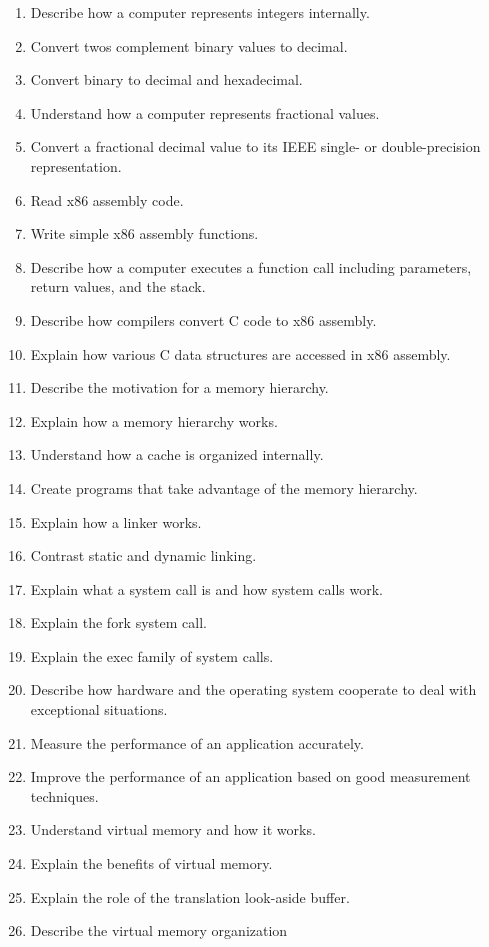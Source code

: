 \documentclass{article}
\begin{document}
\begin{enumerate}
\item Describe how a computer represents integers internally.
\item Convert twos complement binary values to decimal.
\item Convert binary to decimal and hexadecimal.
\item Understand how a computer represents fractional values.
\item Convert a fractional decimal value to its IEEE single- or double-precision representation.
\item Read x86 assembly code.
\item Write simple x86 assembly functions.
\item Describe how a computer executes a function call
including parameters, return values, and the stack.
\item Describe how compilers convert C code to x86 assembly.
\item Explain how various C data structures are accessed in x86 assembly.
\item Describe the motivation for a memory hierarchy.
\item Explain how a memory hierarchy works.
\item Understand how a cache is organized internally.
\item Create programs that take advantage of the memory hierarchy.
\item Explain how a linker works.
\item Contrast static and dynamic linking.
\item Explain what a system call is and how system calls work.
\item Explain the fork system call.
\item Explain the exec family of system calls.
\item Describe how hardware and the operating system cooperate to deal with exceptional
situations.
\item Measure the performance of an application accurately.
\item Improve the performance of an application based on good measurement techniques.
\item Understand virtual memory and how it works.
\item Explain the benefits of virtual memory.
\item Explain the role of the translation look-aside buffer.
\item Describe the virtual memory organization

\end{enumerate}
\end{document}
